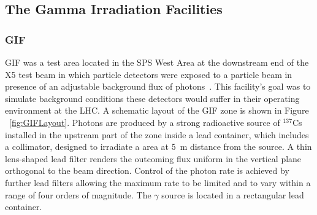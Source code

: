 	\subsection{The Gamma Irradiation Facilities}
	\label{ssec:Facilities}
		\subsubsection{GIF}
		\label{sssec:GIF}
		
			GIF was a test area located in the SPS West Area at the downstream end of the X5 test beam in which particle detectors were exposed to a particle beam in presence of an adjustable background flux of photons~\cite{GIFacility}. This facility's goal was to simulate background conditions these detectors would suffer in their operating environment at the LHC. A schematic layout of the GIF zone is shown in Figure ~\ref{fig:GIFLayout}. Photons are produced by a strong radioactive source of $^{137}$Cs installed in the upstream part of the zone inside a lead container, which includes a collimator, designed to irradiate a  area at \SI{5}{\meter} distance from the source. A thin lens-shaped lead filter renders the outcoming flux uniform in the vertical plane orthogonal to the beam direction. Control of the photon rate is achieved by further lead filters allowing the maximum rate to be limited and to vary within a range of four orders of magnitude. The $\gamma$ source is located in a rectangular lead container.
	
